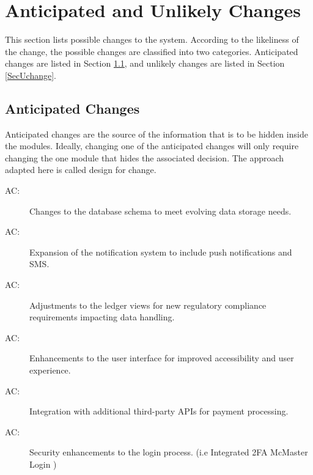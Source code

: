 \documentclass[12pt, titlepage]{article}
\newcounter{acnum}
\newcommand{\actheacnum}{AC\theacnum}
\begin{document}
\section{Anticipated and Unlikely Changes} \label{SecChange}

This section lists possible changes to the system. According to the likeliness
of the change, the possible changes are classified into two
categories. Anticipated changes are listed in Section \ref{SecAchange}, and
unlikely changes are listed in Section \ref{SecUchange}.

\subsection{Anticipated Changes} \label{SecAchange}

Anticipated changes are the source of the information that is to be hidden
inside the modules. Ideally, changing one of the anticipated changes will only
require changing the one module that hides the associated decision. The approach
adapted here is called design for
change.

\begin{description}
\item[ \actheacnum \label{acDataSchema}:] Changes to the database schema to meet evolving data storage needs.
\item[ \actheacnum \label{acNotifications}:] Expansion of the notification system to include push notifications and SMS.
\item[ \actheacnum \label{acCompliance}:] Adjustments to the ledger views for new regulatory compliance requirements impacting data handling.
\item[ \actheacnum \label{acUI}:] Enhancements to the user interface for improved accessibility and user experience.
\item[ \actheacnum \label{acIntegration}:] Integration with additional third-party APIs for payment processing.
\item[ \actheacnum \label{acLogin}:] Security enhancements to the login process. (i.e Integrated 2FA McMaster Login )
\end{description}

\end{document}
